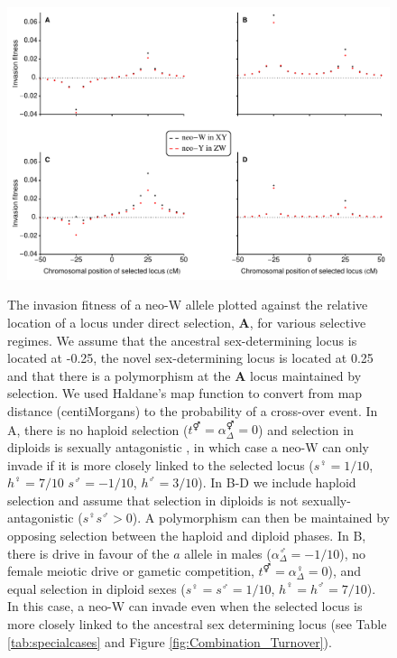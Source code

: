 \documentclass[12pt]{article}
\begin{document}
\begin{figure}[!h]
\centering
\includegraphics[width=\linewidth]{PositionPlot}\\
\caption{
The invasion fitness of a neo-W allele plotted against the relative location of a locus under direct selection, \textbf{A}, for various selective regimes. 
We assume that the ancestral sex-determining locus is located at -0.25, the novel sex-determining locus is located at 0.25 and that there is a polymorphism at the \textbf{A} locus maintained by selection.
We used Haldane's map function \citep[Equation 3 in ][]{Haldane1919} to convert from map distance (centiMorgans) to the probability of a cross-over event. 
In A, there is no haploid selection ($t^\Hermaphrodite=\alpha^\Hermaphrodite_{\Delta}=0$) and selection in diploids is sexually antagonistic \citep[following][]{vanDoorn:2010hu}, in which case a neo-W can only invade if it is more closely linked to the selected locus ($s^\female=1/10$, $h^\female=7/10$ $s^\male=-1/10$, $h^\male=3/10$).
In B-D we include haploid selection and assume that selection in diploids is not sexually-antagonistic ($s^\female s^\male>0$). 
A polymorphism can then be maintained by opposing selection between the haploid and diploid phases. 
In B, there is drive in favour of the $a$ allele in males ($\alpha^\male_{\Delta}=-1/10$), no female meiotic drive or gametic competition, $t^\Hermaphrodite=\alpha^\female_{\Delta}=0$), and equal selection in diploid sexes ($s^\female=s^\male=1/10$, $h^\female=h^\male=7/10$). In this case, a neo-W can invade even when the selected locus is more closely linked to the ancestral sex determining locus (see Table \ref{tab:specialcases} and Figure \ref{fig:Combination_Turnover}). 
}
\end{figure}
\end{document}
